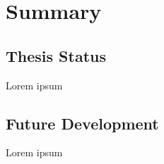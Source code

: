 \chapter{Summary}

\section{Thesis Status}

Lorem ipsum

\section{Future Development}
 
Lorem ipsum
